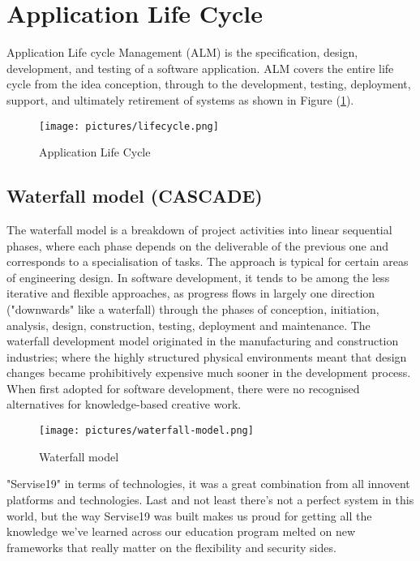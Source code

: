 \documentclass[12pt]{report}
\begin{document}
\section{Application Life Cycle}


Application Life cycle Management (ALM) is the specification, design, development, and testing of a software application. ALM covers the entire life cycle from the idea conception, through to the development, testing, deployment, support, and ultimately retirement of systems as shown in Figure (\ref{fig:applifecycle}).

\begin{figure}[!htbp]

        \centering
    \texttt{[image: pictures/lifecycle.png]}
    \caption{Application Life Cycle}
    \label{fig:applifecycle}
\end{figure}
\subsection{Waterfall model (CASCADE)}
The waterfall model is a breakdown of project activities into linear sequential phases, where each phase depends on the deliverable of the previous one and corresponds to a specialisation of tasks. The approach is typical for certain areas of engineering design. In software development, it tends to be among the less iterative and flexible approaches, as progress flows in largely one direction ("downwards" like a waterfall) through the phases of conception, initiation, analysis, design, construction, testing, deployment and maintenance.
The waterfall development model originated in the manufacturing and construction industries; where the highly structured physical environments meant that design changes became prohibitively expensive much sooner in the development process. When first adopted for software development, there were no recognised alternatives for knowledge-based creative work.

\begin{figure}[!htbp]

        \centering
    \texttt{[image: pictures/waterfall-model.png]}
    \caption{Waterfall model}
    \label{fig:waterfallmodel}
\end{figure}


"Servise19" in terms of technologies, it was a great combination from all innovent platforms and technologies.
Last and not least there's not a perfect system in this world, but the way Servise19 was built makes us proud for getting all the knowledge we've learned across our education program melted on new frameworks that really matter on the flexibility and security sides.
\end{document}
